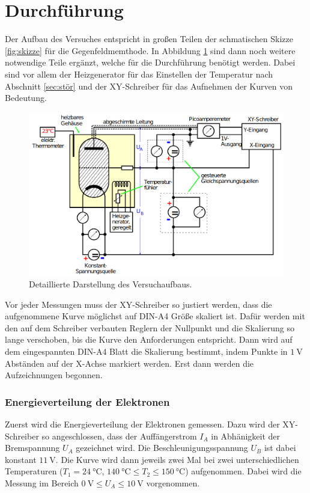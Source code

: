 \section{Durchführung}
\label{sec:Durchführung}
Der Aufbau des Versuches entspricht in großen Teilen der schmatischen Skizze \ref{fig:skizze} für die Gegenfeldmemthode. In Abbildung
\ref{fig:aufbau} sind dann noch weitere notwendige Teile ergänzt, welche für die Durchführung benötigt werden. Dabei sind vor allem der 
Heizgenerator für das Einstellen der Temperatur nach Abschnitt \ref{sec:stör} und der XY-Schreiber für das Aufnehmen der Kurven von 
Bedeutung.
\begin{figure}[H]
    \centering
    \includegraphics[scale = 0.5]{pictures/Aufbau2.png}
    \caption{Detaillierte Darstellung des Versuchaufbaus. \cite{AP01}}
    \label{fig:aufbau}
\end{figure}
\noindent
Vor jeder Messungen muss der XY-Schreiber so justiert werden, dass die aufgenommene Kurve möglichst auf DIN-A4 Größe skaliert ist. 
Dafür werden mit den auf dem Schreiber verbauten Reglern der Nullpunkt und die Skalierung so lange verschoben, bis die Kurve den Anforderungen
entspricht. Dann wird auf dem eingespannten DIN-A4 Blatt die Skalierung bestimmt, indem Punkte in $\SI{1}{\volt}$ Abständen auf der 
X-Achse markiert werden. Erst dann werden die Aufzeichnungen begonnen.

\subsubsection*{Energieverteilung der Elektronen}
Zuerst wird die Energieverteilung der Elektronen gemessen. Dazu wird der XY-Schreiber so angeschlossen, dass der Auffängerstrom $I_A$ in 
Abhänigkeit der Bremspannung $U_A$ gezeichnet wird. Die Beschleunigungsspannung $U_B$ ist dabei konstant $\SI{11}{\volt}$. Die Kurve
wird dann jeweils zwei Mal bei zwei unterschiedlichen Temperaturen ($T_1=\SI{24}{\celsius}$, 
$\SI{140}{\celsius} \leq T_2 \leq \SI{150}{\celsius}$) aufgenommen. Dabei wird die Messung im Bereich $\SI{0}{\volt} \leq U_A \leq 
\SI{10}{\volt}$ vorgenommen. 

